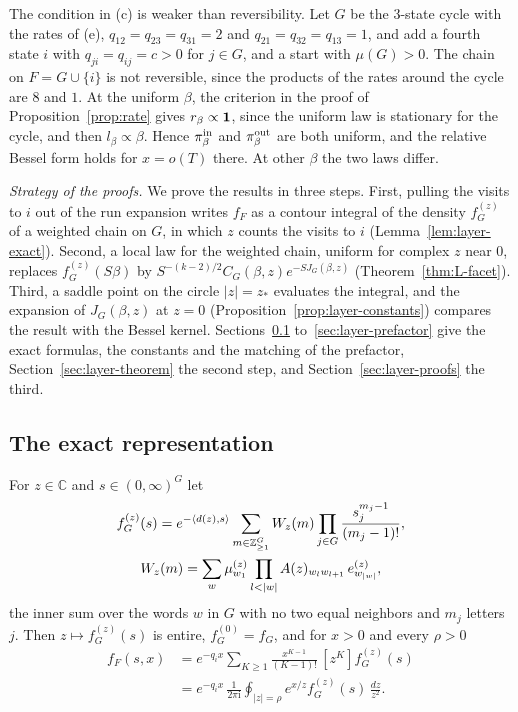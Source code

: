 The condition in (c) is weaker than reversibility. Let $G$ be the 3-state cycle with the rates of (e),
$q_{12}=q_{23}=q_{31}=2$ and $q_{21}=q_{32}=q_{13}=1$, and add a fourth state $i$ with
$q_{ji}=q_{ij}=c>0$ for $j\in G$, and a start with $\mu(G)>0$. The chain on $F=G\cup\{i\}$ is not reversible, since the
products of the rates around the cycle are $8$ and $1$. At the uniform $\beta$, the criterion in
the proof of Proposition~\ref{prop:rate} gives $r_\beta\propto\mathbf{1}$, since the uniform law is
stationary for the cycle, and then $l_\beta\propto\beta$. Hence $\pi^{\rm in}_\beta$ and
$\pi^{\rm out}_\beta$ are both uniform, and the relative Bessel form holds for $x=o(T)$ there.
At other $\beta$ the two laws differ.

\emph{Strategy of the proofs.} We prove the results in three steps. First, pulling the visits to $i$
out of the run expansion writes $f_F$ as a contour integral of the density $f^{(z)}_G$ of a
weighted chain on $G$, in which $z$ counts the visits to $i$
(Lemma~\ref{lem:layer-exact}). Second, a local law for the weighted chain, uniform for complex
$z$ near $0$, replaces $f^{(z)}_G(S\beta)$ by $S^{-(k-2)/2}C_G(\beta,z)e^{-SJ_G(\beta,z)}$
(Theorem~\ref{thm:L-facet}). Third, a saddle point on the circle $|z|=z_*$ evaluates the
integral, and the expansion of $J_G(\beta,z)$ at $z=0$ (Proposition~\ref{prop:layer-constants})
compares the result with the Bessel kernel. Sections~\ref{sec:layer-exact}
to~\ref{sec:layer-prefactor} give the exact formulas, the constants and the matching of the
prefactor, Section~\ref{sec:layer-theorem} the second step, and Section~\ref{sec:layer-proofs}
the third.

\subsection{The exact representation}\label{sec:layer-exact}

\begin{lemma}\label{lem:layer-exact}
For $z\in\mathbb C$ and $s\in(0,\infty)^G$ let
\begin{gather*}
f^{(z)}_G(s)=e^{-\langle d(z),s\rangle}\sum_{m\in\Z_{\ge1}^G}W_z(m)\prod_{j\in G}\frac{s_j^{m_j-1}}{(m_j-1)!},\\
W_z(m)=\sum_w\mu^{(z)}_{w_1}\prod_{l<|w|}A(z)_{w_lw_{l+1}}\,e^{(z)}_{w_{|w|}},
\end{gather*}
the inner sum over the words $w$ in $G$ with no two equal neighbors and $m_j$ letters $j$.
Then $z\mapsto f^{(z)}_G(s)$ is entire, $f^{(0)}_G=f_G$, and for $x>0$ and every $\rho>0$
\begin{align}
f_F(s,x)&=e^{-q_ix}\sum_{K\ge1}\frac{x^{K-1}}{(K-1)!}\,[z^K]f^{(z)}_G(s)\label{eq:layer-series}\\
&=e^{-q_ix}\,\frac1{2\pi\mathrm i}\oint_{|z|=\rho}e^{x/z}f^{(z)}_G(s)\,\frac{dz}{z^2}.\label{eq:layer-contour}
\end{align}
\end{lemma}

